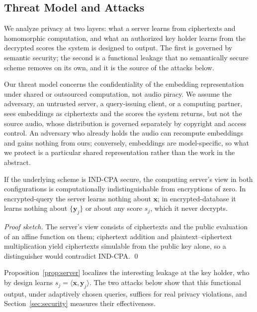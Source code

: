 \documentclass[sigconf,nonacm]{acmart}
\begin{document}
\subsection{Threat Model and Attacks}
\label{subsec:threat}
We analyze privacy at two layers: what a server learns from ciphertexts and homomorphic computation, and what an authorized key holder learns from the decrypted scores the system is designed to output. The first is governed by semantic security; the second is a functional leakage that no semantically secure scheme removes on its own, and it is the source of the attacks below.

Our threat model concerns the confidentiality of the embedding representation under shared or outsourced computation, not audio piracy. We assume the adversary, an untrusted server, a query-issuing client, or a computing partner, sees embeddings as ciphertexts and the scores the system returns, but not the source audio, whose distribution is governed separately by copyright and access control. An adversary who already holds the audio can recompute embeddings and gains nothing from ours; conversely, embeddings are model-specific, so what we protect is a particular shared representation rather than the work in the abstract.

\begin{proposition}
\label{prop:server}
If the underlying scheme is IND-CPA secure, the computing server's view in both configurations is computationally indistinguishable from encryptions of zero. In encrypted-query the server learns nothing about $\mathbf{x}$; in encrypted-database it learns nothing about $\{\mathbf{y}_j\}$ or about any score $s_j$, which it never decrypts.
\end{proposition}
\noindent\emph{Proof sketch.} The server's view consists of ciphertexts and the public evaluation of an affine function on them; ciphertext addition and plaintext--ciphertext multiplication yield ciphertexts simulable from the public key alone, so a distinguisher would contradict IND-CPA. \qed

Proposition~\ref{prop:server} localizes the interesting leakage at the key holder, who by design learns $s_j=\langle\mathbf{x},\mathbf{y}_j\rangle$. The two attacks below show that this functional output, under adaptively chosen queries, suffices for real privacy violations, and Section~\ref{sec:security} measures their effectiveness.
\end{document}
